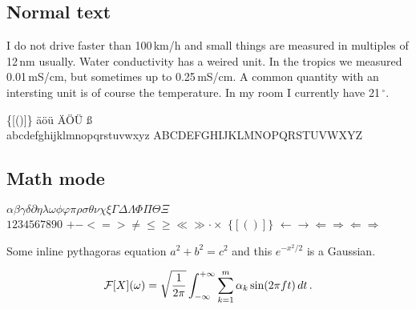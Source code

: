 \subsection{Normal text}

I do not drive faster than 100\,km/h and small things are measured in
multiples of 12\,nm usually. Water conductivity has a weired unit. In
the tropics we measured 0.01\,mS/cm, but sometimes up to
0.25\,mS/cm. A common quantity with an intersting unit is of course
the temperature. In my room I currently have 21\,$^{\circ}$.

\bigskip
{} \qquad \{[()]\} \qquad \"a\"o\"u  \"A\"O\"U {\ss} \\
abcdefghijklmnopqrstuvwxyz \qquad ABCDEFGHIJKLMNOPQRSTUVWXYZ

\subsection{Math mode}

$\alpha\beta\gamma\delta\partial\eta\lambda\omega\phi\varphi\pi\rho\sigma\theta\nu\chi\xi\Gamma\Delta\Lambda\Phi\Pi\Theta\Xi$\\
$1234567890$
\qquad $+ - <=> \ne \le \ge \ll \gg \cdot \times$
\qquad $\{[()]\}$
\qquad $\leftarrow \rightarrow \Leftarrow \Rightarrow \Longleftarrow \Longrightarrow$

\bigskip
\noindent
Some inline pythagoras equation $a^2 + b^2 = c^2$ and this $e^{-x^2/2}$ is a Gaussian.

\[ {\cal F}[X](\omega) = \sqrt{\frac{1}{2\pi}}\int_{-\infty}^{+\infty} \sum_{k=1}^m \alpha_k\sin(2\pi f t)\,dt\,. \]
